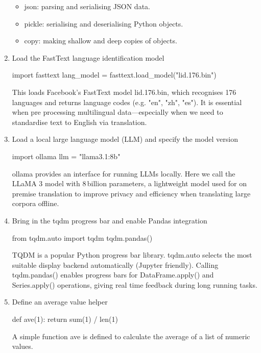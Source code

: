 \documentclass[12pt]{article}
\numberwithin{figure}{section}  %
\begin{document}
\begin{enumerate}
\begin{python}
\end{python}
\begin{itemize}
\item json: parsing and serialising JSON data.
\item pickle: serialising and deserialising Python objects.
\item copy: making shallow and deep copies of objects.
\end{itemize}

\item Load the FastText language identification model
\begin{python}
import fasttext
lang_model = fasttext.load_model("lid.176.bin")

\end{python}
This loads Facebook’s FastText model lid.176.bin, which recognises 176 languages and returns language codes (e.g. "en", "zh", "es"). It is essential when pre processing multilingual data—especially when we need to standardise text to English via translation.

\item Load a local large language model (LLM) and specify the model version
\begin{python}
import ollama
llm = "llama3.1:8b"

\end{python}
ollama provides an interface for running LLMs locally. Here we call the LLaMA 3 model with 8 billion parameters, a lightweight model used for on premise translation to improve privacy and efficiency when translating large corpora offline.
\item Bring in the tqdm progress bar and enable Pandas integration
\begin{python}
from tqdm.auto import tqdm
tqdm.pandas()

\end{python}
TQDM is a popular Python progress bar library. tqdm.auto selects the most suitable display backend automatically (Jupyter friendly). Calling tqdm.pandas() enables progress bars for DataFrame.apply() and Series.apply() operations, giving real time feedback during long running tasks.
\item Define an average value helper
\begin{python}
def ave(1):
    return sum(1) / len(1)

\end{python}
A simple function ave is defined to calculate the average of a list of numeric values.


\end{enumerate}
\end{document}
